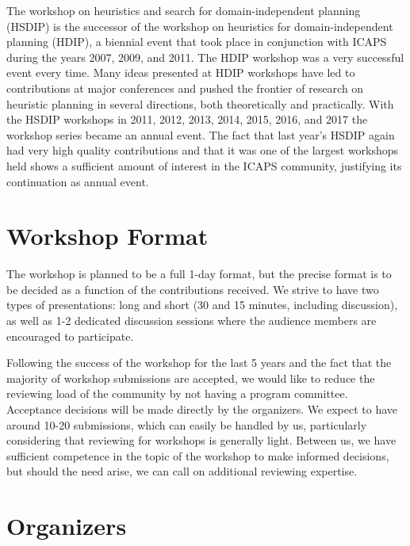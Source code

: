 \documentclass[10pt]{article}
\begin{document}
The workshop on heuristics and search for domain-independent planning
(HSDIP) is the successor of the workshop on heuristics for
domain-independent planning (HDIP), a biennial event that took place
in conjunction with ICAPS during the years 2007, 2009, and 2011. The
HDIP workshop was a very successful event every time. Many ideas
presented at HDIP workshops have led to contributions at major
conferences and pushed the frontier of research on heuristic planning
in several directions, both theoretically and practically.
%
With the HSDIP workshops in 2011, 2012, 2013, 2014, 2015, 2016, and 2017 the
workshop series became an annual event. The fact that last year's HSDIP again had very
high quality contributions and that it was one of the largest workshops held
shows a sufficient amount of interest in the ICAPS community, justifying its
continuation as annual event.

\section*{Workshop Format}

The workshop is planned to be a full 1-day format, but the precise
format is to be decided as a function of the contributions received.
We strive to have two types of presentations: long and short (30 and
15 minutes, including discussion), as well as 1-2 dedicated discussion
sessions where the audience members are encouraged to participate.

Following the success of the workshop for the last 5 years and the fact
that the majority of workshop submissions are accepted, we would like to reduce 
the reviewing load of the community by not having a program
committee. Acceptance decisions will be made directly by the
organizers. We expect to have around 10-20 submissions, which can
easily be handled by us, particularly considering that reviewing for
workshops is generally light. Between us, we have sufficient
competence in the topic of the workshop to make informed decisions,
but should the need arise, we can call on additional reviewing
expertise.

\section*{Organizers}
\end{document}
